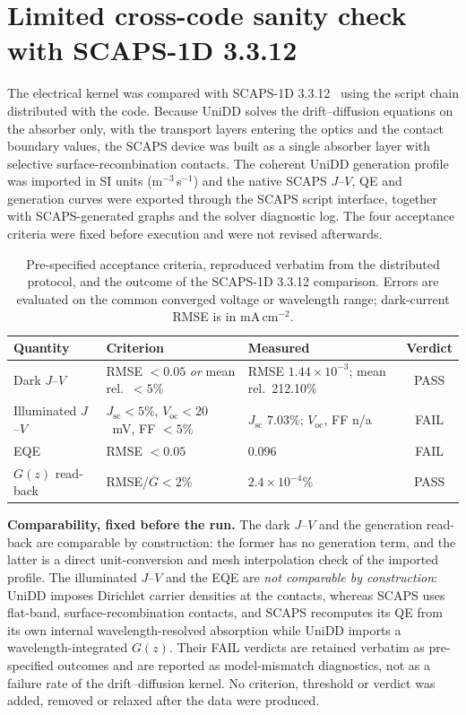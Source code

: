 \documentclass[preprint,12pt]{elsarticle}
\begin{document}
\section{Limited cross-code sanity check with SCAPS-1D 3.3.12}
\label{sec:scaps}

The electrical kernel was compared with SCAPS-1D 3.3.12~\cite{burgelman2000}
using the script chain distributed with the code. Because UniDD solves the
drift--diffusion equations on the absorber only, with the transport layers
entering the optics and the contact boundary values, the SCAPS device was
built as a single absorber layer with selective surface-recombination
contacts. The coherent UniDD generation profile was imported in SI units
(m$^{-3}$\,s$^{-1}$) and the native SCAPS $J$--$V$, QE and generation curves
were exported through the SCAPS script interface, together with
SCAPS-generated graphs and the solver diagnostic log. The four acceptance
criteria were fixed before execution and were not revised afterwards.

\begin{table}[t]
\caption{Pre-specified acceptance criteria, reproduced verbatim from the
distributed protocol, and the outcome of the SCAPS-1D 3.3.12 comparison.
Errors are evaluated on the common converged voltage or wavelength range;
dark-current RMSE is in mA\,cm$^{-2}$.}
\label{tab:scaps}
\centering
\footnotesize
\begin{tabular}{lp{4.3cm}p{4.0cm}c}
\toprule
Quantity & Criterion & Measured & Verdict \\
\midrule
Dark $J$--$V$ & RMSE $<0.05$ \emph{or} mean rel.\ $<5\%$ & RMSE $1.44\times10^{-3}$; mean rel.\ 212.10\% & PASS \\
Illuminated $J$--$V$ & $J_{\mathrm{sc}}<5\%$, $V_{\mathrm{oc}}<20$~mV, FF $<5\%$ & $J_{\mathrm{sc}}$ 7.03\%; $V_{\mathrm{oc}}$, FF n/a & FAIL \\
EQE & RMSE $<0.05$ & 0.096 & FAIL \\
$G(z)$ read-back & RMSE/$\overline{G}<2\%$ & $2.4\times10^{-4}\%$ & PASS \\
\bottomrule
\end{tabular}
\end{table}

\textbf{Comparability, fixed before the run.} The dark $J$--$V$ and the
generation read-back are comparable by construction: the former has no
generation term, and the latter is a direct unit-conversion and mesh
interpolation check of the imported profile. The illuminated $J$--$V$ and the
EQE are \emph{not comparable by construction}: UniDD imposes Dirichlet
carrier densities at the contacts, whereas SCAPS uses flat-band,
surface-recombination contacts, and SCAPS recomputes its QE from its own
internal wavelength-resolved absorption while UniDD imports a
wavelength-integrated $G(z)$. Their FAIL verdicts are retained verbatim as
pre-specified outcomes and are reported as model-mismatch diagnostics, not
as a failure rate of the drift--diffusion kernel. No criterion, threshold
or verdict was added, removed or relaxed after the data were produced.
\end{document}
